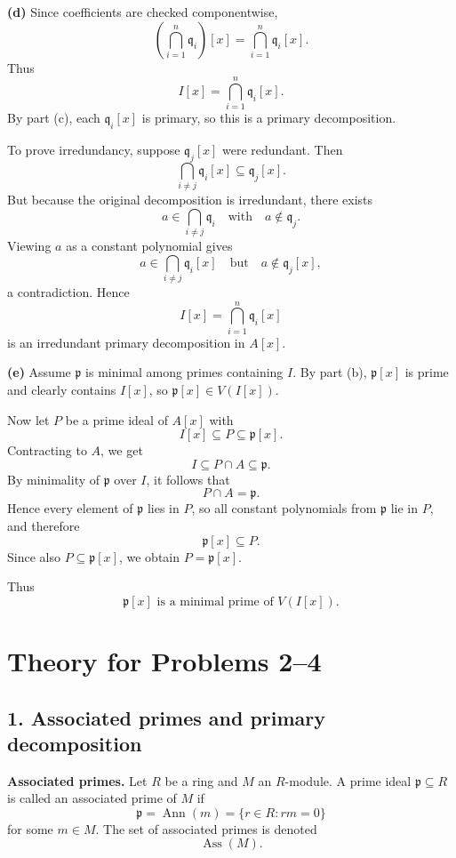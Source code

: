 \documentclass[12pt,a4paper]{article}
\theoremstyle{plain}
\theoremstyle{definition}      %
\begin{document}
	\textbf{(d)}
	Since coefficients are checked componentwise,
	\[
	\left(\bigcap_{i=1}^n \mathfrak q_i\right)[x]
	=
	\bigcap_{i=1}^n \mathfrak q_i[x].
	\]
	Thus
	\[
	I[x]=\bigcap_{i=1}^n \mathfrak q_i[x].
	\]
	By part (c), each \(\mathfrak q_i[x]\) is primary, so this is a primary decomposition.
	
	To prove irredundancy, suppose \(\mathfrak q_j[x]\) were redundant.
	Then
	\[
	\bigcap_{i\neq j}\mathfrak q_i[x]\subseteq \mathfrak q_j[x].
	\]
	But because the original decomposition is irredundant, there exists
	\[
	a\in \bigcap_{i\neq j}\mathfrak q_i
	\quad\text{with}\quad
	a\notin \mathfrak q_j.
	\]
	Viewing \(a\) as a constant polynomial gives
	\[
	a\in \bigcap_{i\neq j}\mathfrak q_i[x]
	\quad\text{but}\quad
	a\notin \mathfrak q_j[x],
	\]
	a contradiction.
	Hence
	\[
	\boxed{I[x]=\bigcap_{i=1}^n \mathfrak q_i[x]}
	\]
	is an irredundant primary decomposition in \(A[x]\).
	
	\textbf{(e)}
	Assume \(\mathfrak p\) is minimal among primes containing \(I\).
	By part (b), \(\mathfrak p[x]\) is prime and clearly contains \(I[x]\), so \(\mathfrak p[x]\in V(I[x])\).
	
	Now let \(P\) be a prime ideal of \(A[x]\) with
	\[
	I[x]\subseteq P\subseteq \mathfrak p[x].
	\]
	Contracting to \(A\), we get
	\[
	I\subseteq P\cap A\subseteq \mathfrak p.
	\]
	By minimality of \(\mathfrak p\) over \(I\), it follows that
	\[
	P\cap A=\mathfrak p.
	\]
	Hence every element of \(\mathfrak p\) lies in \(P\), so all constant polynomials from \(\mathfrak p\) lie in \(P\), and therefore
	\[
	\mathfrak p[x]\subseteq P.
	\]
	Since also \(P\subseteq \mathfrak p[x]\), we obtain \(P=\mathfrak p[x]\).
	
	Thus
	\[
	\boxed{\mathfrak p[x]\text{ is a minimal prime of }V(I[x]).}
	\]
	
	
	\section*{Theory for Problems 2--4}
	
	\subsection*{1. Associated primes and primary decomposition}
	
	\textbf{Associated primes.}
	Let \(R\) be a ring and \(M\) an \(R\)-module. A prime ideal \(\mathfrak p\subseteq R\) is called an associated prime of \(M\) if
	\[
	\mathfrak p=\operatorname{Ann}(m)=\{r\in R:rm=0\}
	\]
	for some \(m\in M\).
	The set of associated primes is denoted
	\[
	\operatorname{Ass}(M).
	\]
	
\end{document}
